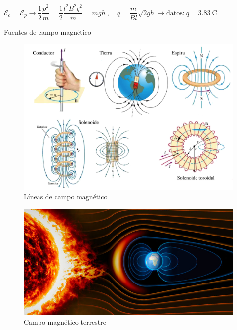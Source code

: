$\mathcal E_c=\mathcal E_p \to  \dfrac 1 2 \dfrac {p^2}m=\dfrac{1}{2}\dfrac{l^2B^2q^2}{m}=mgh\ , \quad
q=\dfrac {m}{Bl} \sqrt{2 g h} \to \text{datos:}\ q=3.83\ \mathrm{C}$
\newpage %
\begin{myblock}{Fuentes de campo magnético}
	
	\begin{figure}[H]
	\centering
	\includegraphics[width=1\textwidth]{imagenes/imagenes26/T26IM32.png}
	\caption*{Líneas de campo magnético}
	\end{figure}
	
	
	\begin{figure}[H]
	\centering
	\includegraphics[width=1\textwidth]{imagenes/imagenes26/T26IM31.png}
	\caption*{Campo magnético terrestre}
	\end{figure}

\end{myblock}
